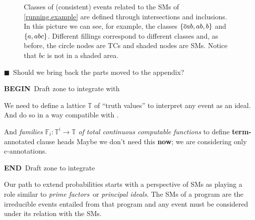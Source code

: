 \documentclass{article}
\newcommand{\at}[1]{\ensuremath{\!\del{#1}}}
\newcommand{\co}[1]{\ensuremath{\overline{#1}}}
\newcommand{\cla}[1]{\ensuremath{{\cal #1}}}
\newcommand{\clx}[1]{\ensuremath{{\mathbb{#1}}}}
\newcommand{\tcgen}[1]{\MODELset\at{#1}}
\newcommand{\ATOMSset}{\ensuremath{\cla{A}}}
\newcommand{\PROBFset}{\ensuremath{\cla{P}}}
\newcommand{\TCHOICEset}{\ensuremath{\cla{T}}}
\newcommand{\MODELset}{\ensuremath{\cla{M}}}
\newcommand{\EVENTSset}{\ensuremath{\cla{E}}}
\newcommand{\CONSISTset}{\ensuremath{\cla{W}}}
\newcommand{\clause}{\ensuremath{\leftarrow}}
\newcommand{\LOOK}{\ensuremath{\blacksquare}}
\newcommand{\franc}[1]{{\color{green!30!black}#1}}
\newcounter{remark}
\newcommand{\note}[1]{
	\stepcounter{remark}%
	{\!\!\color{red}/}\footnotemark[\arabic{remark}]\!\!%
	\footnotetext[\arabic{remark}]{{\color{red}/}#1}
}
\begin{document}
\begin{figure}[t]
	\caption{Classes of (consistent) events related to the \aclp{SM}
	  of \cref{running.example} are defined through intersections and
	  inclusions.  In this picture we can see, for example, the
	  classes $\set{\co{c}ab, ab, b}$ and $\set{a, abc}$.  Different
	  fillings correspond to different classes and, as before, the
	  circle nodes are \aclp{TC} and shaded nodes are \aclp{SM}.
	  Notice that $bc$ is not in a shaded area.}
	\label{fig:running.example.classes}
\end{figure}

\franc{\LOOK~Should we bring back the parts moved to the appendix?}

%
%

\franc{\textbf{BEGIN}~Draft zone to integrate with \cite{kifer1992theory}}
%

We need to \franc{define a lattice $\clx{T}$} of ``truth values'' to \franc{interpret any event} as an \franc{ideal}. And do so in a way compatible with \cite{kifer1992theory}. 


And \textit{families $\clx{F}_i:\clx{T}^i \to \clx{T}$ of total continuous computable functions} to define \textbf{term-}annotated clause heads \franc{Maybe we don't need this \textbf{now}}; we are considering only c-annotations.

\franc{\textbf{END}~Draft zone to integrate \cite{kifer1992theory}}
%
%

Our path to extend probabilities starts with a perspective of
\aclp{SM} as playing a role similar to \emph{prime factors}\franc{~or \emph{principal ideals}}.  The
\aclp{SM} of a program are the irreducible events entailed from that
program and any event must be considered under its relation with the
\aclp{SM}.
\end{document}
